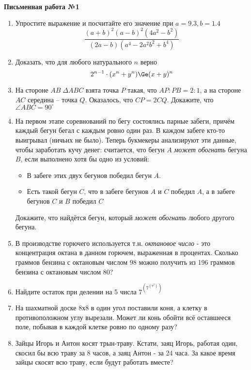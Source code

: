 \documentclass[12pt]{article}
\begin{document}
\centerline{\large \bf Письменная работа №1}
\begin{enumerate}
\item Упростите выражение и посчитайте его значение при $a = 9.3, b = 1.4$
\begin{equation*}
\frac{(a + b)^2(a - b)^2(4a^2 - b^2)}{(2a - b)(a^4 - 2a^2b^2 + b^4)}
\end{equation*}
\item Доказать, что для любого натурального $n$ верно
\begin{equation*}
    2^{n - 1} \cdot (x^n + y^n) \Ge (x + y)^n
\end{equation*}
\item На стороне $AB \; \Delta ABC$ взята точка $P$ такая, что $AP : PB = 2 : 1$, а на стороне $AC$
середина -- точка $Q$. Оказалось, что $CP = 2CQ$. Докажите, что $\angle ABC = 90^{\circ}$
\item На первом этапе соревнований по бегу состоялись парные забеги, причём каждый бегун бегал с
каждым ровно один раз. В каждом забеге кто-то выигрывал (ничьих не было).
Теперь букмекеры анализируют эти данные, чтобы заработать кучу денег:
считается, что бегун $A$ {\it может обогнать} бегуна $B$, если выполнено хотя бы одно из условий:
\begin{itemize}
    \item В забеге этих двух бегунов победил бегун $A$.
    \item Есть такой бегун $C$, что в забеге бегунов $A$ и $C$ победил $A$, а в забеге бегунов $C$ и
    $B$ победил $C$
\end{itemize}
Докажите, что найдётся бегун, который {\it может обогнать} любого другого бегуна.
\item В производстве горючего используется т.н. {\it октановое число} - это концентрация октана в
данном горючем, выраженная в процентах. Сколько граммов бензина с октановым числом 98 можно получить
из 196 граммов бензина с октановым числом 80?
\item Найдите остаток при делении на 5 числа {\large $7^{\left(7^{(7^{7})}\right)}$}
\item На шахматной доске 8х8 в один угол поставили коня, а клетку в противоположном углу вырезали.
Может ли конь обойти всё оставшееся поле, побывав в каждой клетке ровно по одному разу?
\item Зайцы Игорь и Антон косят трын-траву. Кстати, заяц Игорь, работая один, скосил бы всю траву за
8 часов, а заяц Антон - за 24 часа. За какое время зайцы скосят всю траву, если будут работать
вместе?
\end{enumerate}
\end{document}
